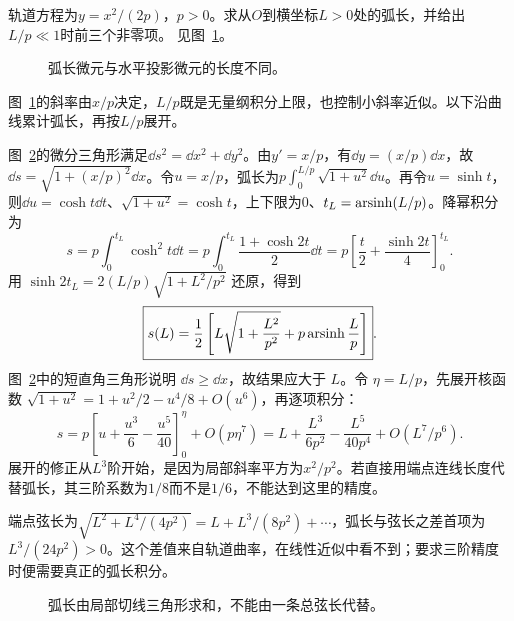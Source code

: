 \begin{exercise}[抛物线轨道的弧长]\label{ex:c1-h10}
轨道方程为$y=x^2/(2p)$，$p>0$。求从$O$到横坐标$L>0$处的弧长，并给出$L/p\ll1$时前三个非零项。 见图~\ref{fig:c1-h10-q}。
\end{exercise}

\begin{figure}[H]\centering
{}
\caption{弧长微元与水平投影微元的长度不同。}\label{fig:c1-h10-q}
\end{figure}
\begin{solution}
图~\ref{fig:c1-h10-q}的斜率由$x/p$决定，$L/p$既是无量纲积分上限，也控制小斜率近似。以下沿曲线累计弧长，再按$L/p$展开。


图~\ref{fig:c1-h10-s}的微分三角形满足$\dd s^2=\dd x^2+\dd y^2$。由$y'=x/p$，有$\dd y=(x/p)\dd x$，故$\dd s=\sqrt{1+(x/p)^2}\dd x$。令$u=x/p$，弧长为$p\int_0^{L/p}\sqrt{1+u^2}\dd u$。再令$u=\sinh t$，则$\dd u=\cosh t\dd t$、$\sqrt{1+u^2}=\cosh t$，上下限为$0$、$t_L=\operatorname{arsinh}(L/p)$。降幂积分为
\[
s=p\int_0^{t_L}\cosh^2t\dd t
=p\int_0^{t_L}\frac{1+\cosh2t}{2}\dd t
=p\left[\frac t2+\frac{\sinh2t}{4}\right]_0^{t_L}.
\]
用 $\sinh2t_L=2(L/p)\sqrt{1+L^2/p^2}$ 还原，得到
\[\boxed{s(L)=\frac12\left[L\sqrt{1+\frac{L^2}{p^2}}+p\operatorname{arsinh}\frac Lp\right]}.
\]
图~\ref{fig:c1-h10-s}中的短直角三角形说明 $\dd s\ge\dd x$，故结果应大于 $L$。令 $\eta=L/p$，先展开核函数 $\sqrt{1+u^2}=1+u^2/2-u^4/8+O(u^6)$，再逐项积分：
\[s=p\left[u+\frac{u^3}{6}-\frac{u^5}{40}\right]_0^\eta+O(p\eta^7)
=\boxed{L+\frac{L^3}{6p^2}-\frac{L^5}{40p^4}+O(L^7/p^6)}.
\]
展开的修正从$L^3$阶开始，是因为局部斜率平方为$x^2/p^2$。若直接用端点连线长度代替弧长，其三阶系数为$1/8$而不是$1/6$，不能达到这里的精度。


端点弦长为$\sqrt{L^2+L^4/(4p^2)}=L+L^3/(8p^2)+\cdots$，弧长与弦长之差首项为$L^3/(24p^2)>0$。这个差值来自轨道曲率，在线性近似中看不到；要求三阶精度时便需要真正的弧长积分。

\begin{figure}[H]\centering
{}
\caption{弧长由局部切线三角形求和，不能由一条总弦长代替。}\label{fig:c1-h10-s}
\end{figure}
\end{solution}

